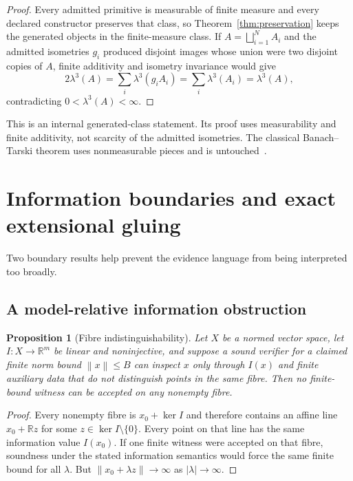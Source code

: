 \documentclass[11pt]{article}
\newtheorem{proposition}[theorem]{Proposition}
\theoremstyle{definition}
\newcommand{\norm}[1]{\left\lVert #1 \right\rVert}
\newcommand{\R}{\mathbb{R}}
\begin{document}
\begin{proof}
Every admitted primitive is measurable of finite measure and every declared constructor
preserves that class, so Theorem~\ref{thm:preservation} keeps the generated objects in the
finite-measure class.  If
$A=\bigsqcup_{i=1}^N A_i$ and the admitted isometries $g_i$ produced disjoint images whose
union were two disjoint copies of $A$, finite additivity and isometry invariance would give
\[
 2\lambda^3(A)
 =\sum_i\lambda^3(g_iA_i)
 =\sum_i\lambda^3(A_i)
 =\lambda^3(A),
\]
contradicting $0<\lambda^3(A)<\infty$.
\end{proof}

This is an internal generated-class statement.  Its proof uses measurability and finite
additivity, not scarcity of the admitted isometries.  The classical Banach--Tarski theorem
uses nonmeasurable pieces and is untouched~\cite{BanachTarski1924}.

\section{Information boundaries and exact extensional gluing}\label{sec:boundaries}

Two boundary results help prevent the evidence language from being interpreted too
broadly.

\subsection{A model-relative information obstruction}

\begin{proposition}[Fibre indistinguishability]\label{prop:fibre}
Let $X$ be a normed vector space, let $I:X\to\R^m$ be linear and noninjective, and suppose a
sound verifier for a claimed finite norm bound $\norm x\le B$ can inspect $x$ only through
$I(x)$ and finite auxiliary data that do not distinguish points in the same fibre.  Then no finite-bound witness can be accepted on any nonempty fibre.
\end{proposition}

\begin{proof}
Every nonempty fibre is $x_0+\ker I$ and therefore contains an affine line
$x_0+\R z$ for some $z\in\ker I\setminus\{0\}$.  Every point on that line has the same information value $I(x_0)$.  If one finite witness were
accepted on that fibre, soundness under the stated information semantics would force the
same finite bound for all $\lambda$.  But
$\norm{x_0+\lambda z}\to\infty$ as $|\lambda|\to\infty$.
\end{proof}
\end{document}
